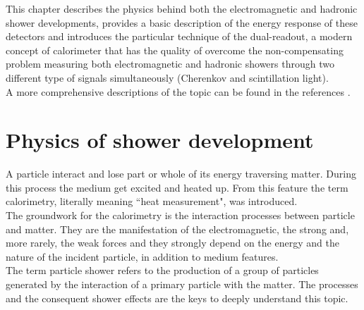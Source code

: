 
This chapter describes the physics behind both the electromagnetic and hadronic shower developments, provides a basic description of the energy response of these detectors and introduces the particular technique of the dual-readout, a modern concept of calorimeter that has the quality of overcome the non-compensating problem measuring both electromagnetic and hadronic showers through two different type of signals simultaneously (Cherenkov and scintillation light).\\

A more comprehensive descriptions of the topic can be found in the references \cite{Wigmans_book, Wigmans_art_of_cal, Gianotti_article}.

\section{Physics of shower development}
A particle interact and lose part or whole of its energy traversing matter. During this process the medium get excited and heated up. From this feature the term calorimetry, literally meaning ``heat measurement", was introduced.\\
The groundwork for the calorimetry is the interaction processes between particle and matter. They are the manifestation of the electromagnetic, the strong and, more rarely, the weak forces and they strongly depend on the energy and the nature of the incident particle, in addition to medium features.\\
The term particle shower refers to the production of a group of particles generated by the interaction of a primary particle with the matter. The processes and the consequent shower effects are the keys to deeply understand this topic.\\

